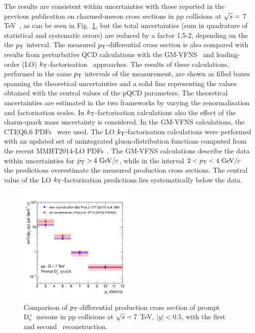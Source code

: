 The results are consistent within uncertainties with 
those reported in the previous publication on charmed-meson 
cross sections in pp collisions at $\sqrt{s}=$ 7 TeV~\cite{ALICE:2011aa,Abelev:2012tca},
as can be seen in Fig.~\ref{fig:comparisonPass2Pass4}, 
but the total uncertainties (sum in quadrature of statistical and systematic
errors) are reduced by a factor 1.5-2, depending on the the $p_{\rm T}$ interval.
The measured $p_{\rm T}$-differential cross section is also compared with results from 
perturbative QCD calculations with the GM-VFNS~\cite{Kniehl:2004fy,Kniehl:2005mk,Kniehl:2012ti}
and leading-order (LO) $k_{\rm T}$-factorisation~\cite{Maciula:2013wg} approaches.
The results of these calculations, performed in the same $p_{\rm T}$ intervals of the 
measurement, are shown as filled boxes spanning the theoretical uncertainties
and a solid line representing the values obtained with the central values of 
the pQCD parameters.
The theoretical uncertainties are estimated in the two frameworks
by varying the renormalisation and factorisation scales. 
In $k_{\rm T}$-factorisation calculations also the effect of the 
charm-quark mass uncertainty is considered.
In the GM-VFNS calculations, the CTEQ6.6 PDFs~\cite{Pumplin:2002vw}
were used. The LO $k_{\rm T}$-factorisation calculations were performed
with an updated set of unintegrated gluon-distribution functions computed 
from the recent MMHT2014-LO PDFs~\cite{Harland-Lang:2014zoa}.
The GM-VFNS calculations describe the data within 
uncertainties for $p_{\rm T}>4~\mathrm{GeV}/c$, while in the interval
$2<p_{\rm T}<4~\mathrm{GeV}/c$ the predictions overestimate the measured production
cross sections. The central value of the LO $k_{\rm T}$-factorisation predictions lies systematically 
below the data.\\

\begin{figure}[!htb]
\begin{center}
\includegraphics[width=0.5\textwidth]{FigCap4/CrossSec_pass4_publPass2.png}
\caption{Comparison of $p_{\rm T}$-differential production cross section of prompt ${\rm D_s^+}$ mesons 
in pp collisions at $\sqrt{s} = 7 $ TeV, $|y|<0.5$, with the first~\cite{Abelev:2012tca} and second~\cite{Acharya:2017jgo} reconstruction.}
\label{fig:comparisonPass2Pass4}
\end{center}
\end{figure}

